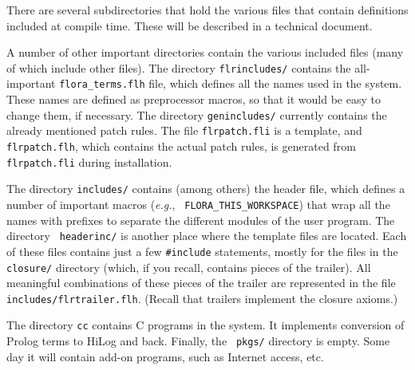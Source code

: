 \documentclass[11pt]{article}
\begin{document}
There are several subdirectories that hold the various files that contain
definitions included at compile time. These will be described in a
technical document.

A number of other important directories contain the various included files
(many of which include other files). The directory {\tt flrincludes/}
contains the all-important {\tt flora\_terms.flh} file, which defines all
the names used in the system. These names are defined as preprocessor
macros, so that it would be easy to change them, if necessary.
The directory {\tt genincludes/} currently contains the already mentioned
patch rules. The file {\tt flrpatch.fli} is a template, and {\tt
  flrpatch.flh}, which contains the actual patch rules, is generated from
{\tt flrpatch.fli} during installation.

The directory {\tt includes/} contains (among others) the header file,
which defines a number of important macros ({\it e.g.}, {\tt
  FLORA\_THIS\_WORKSPACE}) that wrap all the names with prefixes to
separate the different modules of the user program.  The directory {\tt
  headerinc/} is another place where the template files are located. Each
of these files contains just a few {\tt \#include} statements, mostly for
the files in the {\tt closure/} directory (which, if you recall, contains
pieces of the trailer). All meaningful combinations of these pieces of the
trailer are represented in the file {\tt includes/flrtrailer.flh}.  (Recall
that trailers implement the closure axioms.)

The directory {\tt cc} contains C programs in the system. It
implements conversion of Prolog terms to HiLog and back. Finally, the {\tt
  pkgs/} directory is empty. Some day it will contain add-on programs, such
as Internet access, etc.


\newpage



\printindex
\end{document}
